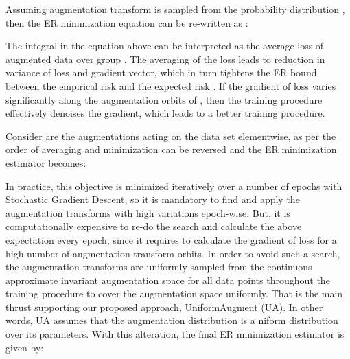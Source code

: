 \documentclass[runningheads]{llncs}
\begin{document}
	Assuming augmentation transform  is sampled from the probability distribution , then the ER minimization equation can be re-written as \cite{chen2019invariance}:
	
	The integral in the equation above can be interpreted as the average loss of augmented data over group . The averaging of the loss leads to reduction in variance of loss and gradient vector, which in turn tightens the ER bound between the empirical risk and the expected risk \cite{chen2019invariance}. If the gradient of loss varies significantly along the augmentation orbits of , then the training procedure effectively denoises the gradient, which leads to a better training procedure. 
	
	Consider  are the augmentations acting on the data set  elementwise, as per \cite{chen2019invariance} the order of averaging and minimization can be reversed and the ER minimization estimator becomes:
	
	
	In practice, this objective is minimized iteratively over a number of epochs with Stochastic Gradient Descent, so it is mandatory to find and apply the augmentation transforms with high variations epoch-wise. But, it is computationally expensive to re-do the search and calculate the above expectation every epoch, since it requires to calculate the gradient of loss for a high number of augmentation transform orbits. In order to avoid such a search, the augmentation transforms are uniformly sampled from the continuous approximate invariant augmentation space for all data points throughout the training procedure to cover the augmentation space uniformly. That is the main thrust supporting our proposed approach, UniformAugment (UA). In other words, UA assumes that the augmentation distribution  is a niform distribution over its parameters. With this alteration, the final ER minimization estimator is given by:
	
\end{document}
